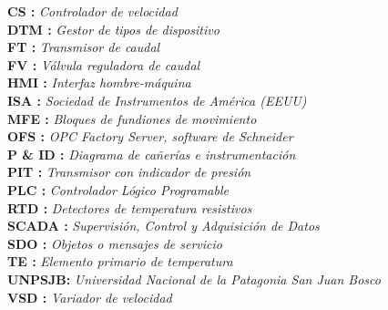\noindent %
\textbf{CS :} \textit{Controlador de velocidad}\\
\textbf{DTM :} \textit{Gestor de tipos de dispositivo}\\
\textbf{FT :} \textit{Transmisor de caudal}\\
\textbf{FV :} \textit{Válvula reguladora de caudal}\\
\textbf{HMI :} \textit{Interfaz hombre-máquina}\\
\textbf{ISA :} \textit{Sociedad de Instrumentos de América (EEUU)}\\
\textbf{MFE :} \textit{Bloques de fundiones de movimiento}\\
\textbf{OFS :} \textit{OPC Factory Server, software de Schneider}\\
\textbf{P \& ID :} \textit{Diagrama de cañerías e instrumentación}\\
\textbf{PIT :} \textit{Transmisor con indicador de presión}\\
\textbf{PLC :} \textit{Controlador Lógico Programable}\\
\textbf{RTD :} \textit{Detectores de temperatura resistivos}\\
\textbf{SCADA :} \textit{Supervisión, Control y Adquisición de Datos}\\ %
\textbf{SDO :} \textit{Objetos o mensajes de servicio}\\
\textbf{TE :} \textit{Elemento primario de temperatura}\\
\textbf{UNPSJB:} \textit{Universidad Nacional de la Patagonia San Juan Bosco}\\
\textbf{VSD :} \textit{Variador de velocidad}\\

\newpage

